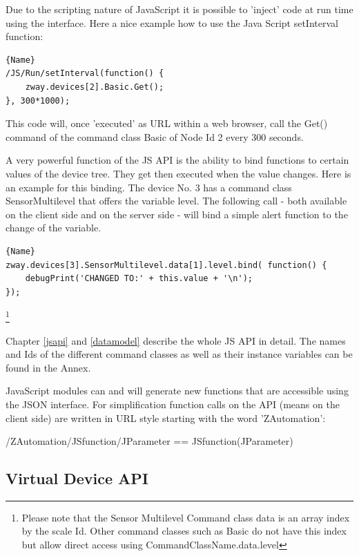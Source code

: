 Due to the scripting nature of JavaScript it is possible to 'inject' code at run time
using the interface. Here a nice example how to use the Java Script 
setInterval function:

\begin{lstlisting}[caption=Polling of device \#2]{Name}
/JS/Run/setInterval(function() { 
	zway.devices[2].Basic.Get();
}, 300*1000);
\end{lstlisting}

This code will, once 'executed' as URL within a web browser, call the Get() command
of the command class Basic of Node Id 2 every 300 seconds.  

A very powerful function of the JS API is the ability to bind functions to certain
values of the device tree. They get then executed when the value changes. Here is an 
example for this binding. The device No. 3 has a command class SensorMultilevel that offers
the variable level. The following call - both available on the client side 
and on the server side - will bind a simple alert function to the change of 
the variable.

\begin{lstlisting}[caption=Bind a function]{Name}
zway.devices[3].SensorMultilevel.data[1].level.bind( function() { 
	debugPrint('CHANGED TO:' + this.value + '\n'); 
});  
\end{lstlisting}\footnote{Please note that the Sensor Multilevel Command class data is an array
index by the scale Id. Other command classes such as Basic do not have this index but allow direct access using 
CommandClassName.data.level}

Chapter \ref{jsapi} and \ref{datamodel} describe the whole JS API in detail. The names 
and Ids of the different command classes as well as their instance variables can be found
in the Annex.

JavaScript modules can and will generate new functions that are accessible using the 
JSON interface. For simplification function calls on the API (means on the client
side) are written in URL style starting with the word 'ZAutomation':

\begin{center}
/ZAutomation/JSfunction/JParameter
== JSfunction(JParameter)
\end{center}

\subsection{Virtual Device API}

